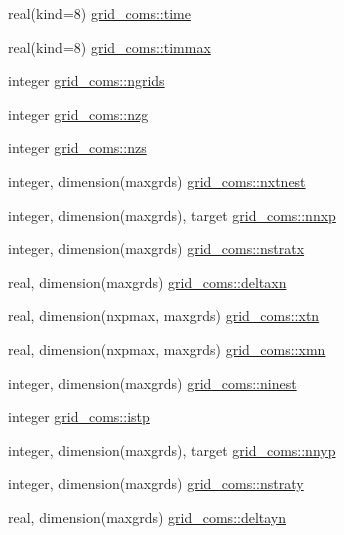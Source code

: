 \begin{DoxyCompactItemize}
\item 
real(kind=8) \hyperlink{namespacegrid__coms_a620c7c9f9699aec60464ae63865bd8bc}{grid\+\_\+coms\+::time}
\item 
real(kind=8) \hyperlink{namespacegrid__coms_a0d5d3c6d496f754a977e81e980b57006}{grid\+\_\+coms\+::timmax}
\item 
integer \hyperlink{namespacegrid__coms_ae4989ce85dc7d8d012ce238bcdc5946d}{grid\+\_\+coms\+::ngrids}
\item 
integer \hyperlink{namespacegrid__coms_a142d9d74c03f8fa05eda4634bfbe0b83}{grid\+\_\+coms\+::nzg}
\item 
integer \hyperlink{namespacegrid__coms_a760d4b670328e4c3a0a7accfdac64c19}{grid\+\_\+coms\+::nzs}
\item 
integer, dimension(maxgrds) \hyperlink{namespacegrid__coms_a3a74d4b8ff65bb4d8f8eb2f22a91c68d}{grid\+\_\+coms\+::nxtnest}
\item 
integer, dimension(maxgrds), target \hyperlink{namespacegrid__coms_a94ce46153415e535023e58d322bcaa98}{grid\+\_\+coms\+::nnxp}
\item 
integer, dimension(maxgrds) \hyperlink{namespacegrid__coms_a319d9e19581f63cae8b605b8c8a6ab85}{grid\+\_\+coms\+::nstratx}
\item 
real, dimension(maxgrds) \hyperlink{namespacegrid__coms_a6adc70cd69fe9f3ba2d1f5c8ebb9ab74}{grid\+\_\+coms\+::deltaxn}
\item 
real, dimension(nxpmax, maxgrds) \hyperlink{namespacegrid__coms_ac434d86587ed3416352d2ee40a8a542f}{grid\+\_\+coms\+::xtn}
\item 
real, dimension(nxpmax, maxgrds) \hyperlink{namespacegrid__coms_aedf16bdd9f6805d93904a372e5f5ac32}{grid\+\_\+coms\+::xmn}
\item 
integer, dimension(maxgrds) \hyperlink{namespacegrid__coms_aed0f3b9fcb2b4db297ffcea4d0bb1450}{grid\+\_\+coms\+::ninest}
\item 
integer \hyperlink{namespacegrid__coms_abf2dd76ce141fe111aca84a224e4df29}{grid\+\_\+coms\+::istp}
\item 
integer, dimension(maxgrds), target \hyperlink{namespacegrid__coms_a5776874c241f87f4651671b401170756}{grid\+\_\+coms\+::nnyp}
\item 
integer, dimension(maxgrds) \hyperlink{namespacegrid__coms_a2886e23677c5f71657725bda33ccaba8}{grid\+\_\+coms\+::nstraty}
\item 
real, dimension(maxgrds) \hyperlink{namespacegrid__coms_a9223404a2c92ad4c68494e9200f2d604}{grid\+\_\+coms\+::deltayn}

\end{DoxyCompactItemize}
